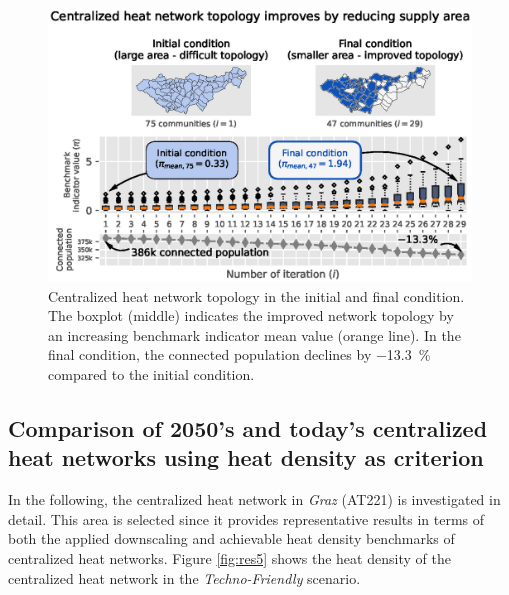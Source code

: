 \begin{figure}
	\centering
	\includegraphics[width=1\linewidth]{figures/4_Results/Fig_Boxplot/ext_boxplot.eps}
	\caption{Centralized heat network topology in the initial and final condition. The boxplot (middle) indicates the improved network topology by an increasing benchmark indicator mean value (orange line). In the final condition, the connected population declines by \SI{-13.3}{\%} compared to the initial condition.}
	\label{fig:res3}
\end{figure}

\subsection{Comparison of 2050's and today's centralized heat networks using heat density as criterion}\label{res:5}
In the following, the centralized heat network in \textit{Graz} (AT221) is investigated in detail. This area is selected since it provides representative results in terms of both the applied downscaling and achievable heat density benchmarks of centralized heat networks. Figure \ref{fig:res5} shows the heat density of the centralized heat network in the \textit{Techno-Friendly} scenario. 

